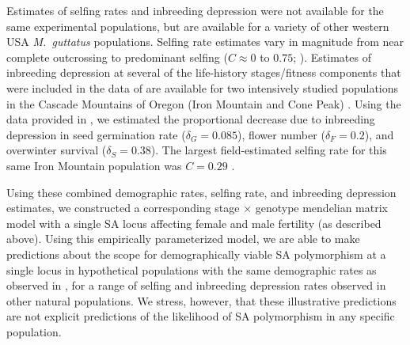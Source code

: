 \documentclass[11pt]{article}
\begin{document}
Estimates of selfing rates and inbreeding depression were not available for the same experimental populations, but are available for a variety of other western USA {\itshape M.~guttatus} populations. Selfing rate estimates vary in magnitude from near complete outcrossing to predominant selfing ($C \approx 0$ to $0.75$; \citealt{RitlandGanders1987, Ritland1990, Willis1999b}). Estimates of inbreeding depression at several of the life-history stages/fitness components that were included in the data of \citet{PetersonEtAl2016} are available for two intensively studied populations in the Cascade Mountains of Oregon (Iron Mountain and Cone Peak) \citet{Willis1993, Willis1999a, Willis1999b}. Using the data provided in \citet{Willis1993}, we estimated the proportional decrease due to inbreeding depression in seed germination rate ($\delta_{G} = 0.085$), flower number ($\delta_{F} = 0.2$), and overwinter survival ($\delta_{S} = 0.38$). The largest field-estimated selfing rate for this same Iron Mountain population was $C = 0.29$ \citep{Willis1993}.

Using these combined demographic rates, selfing rate, and inbreeding depression estimates, we constructed a corresponding stage $\times$ genotype mendelian matrix model with a single SA locus affecting female and male fertility (as described above). Using this empirically parameterized model, we are able to make predictions about the scope for demographically viable SA polymorphism at a single locus in hypothetical populations with the same demographic rates as observed in \citet{PetersonEtAl2016}, for a range of selfing and inbreeding depression rates observed in other natural populations. We stress, however, that these illustrative predictions are not explicit predictions of the likelihood of SA polymorphism in any specific population.
\end{document}
